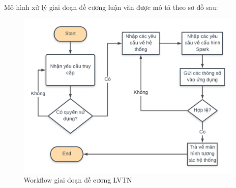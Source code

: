 \documentclass[11pt,a4paper]{article}
\begin{document}
Mô hình xử lý giai đoạn đề cương luận văn được mô tả theo sơ đồ sau:
\begin{figure}[h]
    \centering
    \includegraphics[width=16cm]{fig/diagram.png}
    \caption{Workflow giai đoạn đề cương LVTN}
    \label{fig:decuong_workflow}
\end{figure}
\newpage
\end{document}
